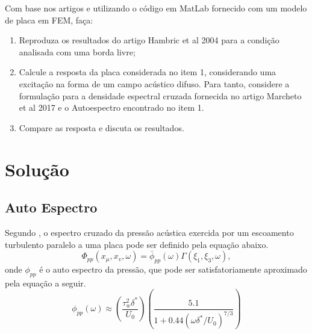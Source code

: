 \documentclass[9pt,a4paper,twoside]{rho-class/rho}
\begin{document}
Com base nos artigos e utilizando o código em MatLab fornecido com um modelo de placa em FEM, faça:

\begin{enumerate}
	\item  Reproduza os resultados do artigo Hambric et al 2004 para a condição analisada com uma borda livre;
	\item Calcule a resposta da placa considerada no item 1, considerando uma excitação na forma de um campo acústico difuso. Para tanto, considere a formulação para a densidade espectral cruzada fornecida no artigo Marcheto et al 2017 e o Autoespectro encontrado no item 1.
	\item Compare as resposta e discuta os resultados.
\end{enumerate}

\section{Solução}
\subsection{Auto Espectro}
Segundo \cite{hambricVibrationsPlatesClamped2004}, o espectro cruzado da pressão acústica exercida por um escoamento turbulento paralelo a uma placa pode ser definido pela equação abaixo.
\begin{equation}
	\Phi_{pp}(x_\mu,x_v,\omega)=\bar{\phi}_{pp}(\omega)\Gamma(\xi_1,\xi_3,\omega),
\end{equation}
onde $\phi_{pp}$ é o auto espectro da pressão, que pode ser satisfatoriamente aproximado pela equação a seguir.
\begin{equation}
	\phi_{pp}(\omega)\approx\left(\frac{\tau_w^2\delta^*}{U_0}\right)\left(\frac{5.1}{1+0.44(\omega\delta^*/U_0)^{7/3}}\right)
\end{equation}
\end{document}
